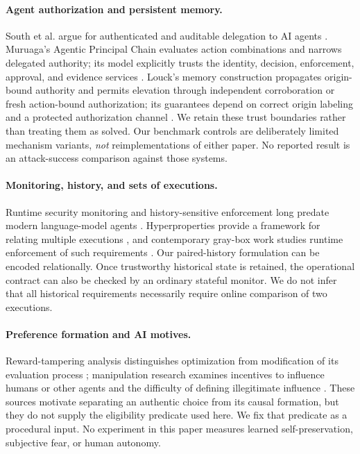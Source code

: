 \documentclass[11pt,a4paper]{article}
\theoremstyle{definition}\newtheorem{definition}{Definition}
\begin{document}
\paragraph{Agent authorization and persistent memory.}
South et al. argue for authenticated and auditable delegation to AI agents \cite{south}. Muruaga's Agentic Principal Chain evaluates action combinations and narrows delegated authority; its model explicitly trusts the identity, decision, enforcement, approval, and evidence services \cite{muruaga}. Louck's memory construction propagates origin-bound authority and permits elevation through independent corroboration or fresh action-bound authorization; its guarantees depend on correct origin labeling and a protected authorization channel \cite{louck}. We retain these trust boundaries rather than treating them as solved. Our benchmark controls are deliberately limited mechanism variants, \emph{not} reimplementations of either paper. No reported result is an attack-success comparison against those systems.

\paragraph{Monitoring, history, and sets of executions.}
Runtime security monitoring and history-sensitive enforcement long predate modern language-model agents \cite{schneider}. Hyperproperties provide a framework for relating multiple executions \cite{clarkson}, and contemporary gray-box work studies runtime enforcement of such requirements \cite{hsu}. Our paired-history formulation can be encoded relationally. Once trustworthy historical state is retained, the operational contract can also be checked by an ordinary stateful monitor. We do not infer that all historical requirements necessarily require online comparison of two executions.

\paragraph{Preference formation and AI motives.}
Reward-tampering analysis distinguishes optimization from modification of its evaluation process \cite{everitt}; manipulation research examines incentives to influence humans or other agents and the difficulty of defining illegitimate influence \cite{carroll}. These sources motivate separating an authentic choice from its causal formation, but they do not supply the eligibility predicate used here. We fix that predicate as a procedural input. No experiment in this paper measures learned self-preservation, subjective fear, or human autonomy.
\end{document}
